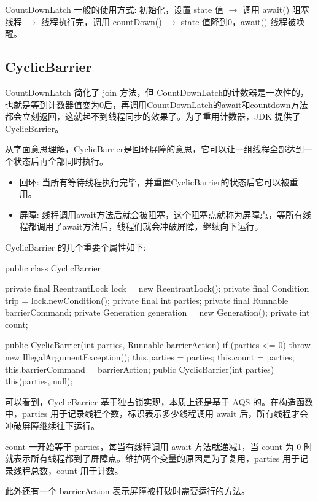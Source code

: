 CountDownLatch 一般的使用方式: 初始化，设置 state 值 $\rightarrow$ 调用 await() 阻塞线程 $\rightarrow$ 线程执行完，调用 countDown()  $\rightarrow$ state 值降到0，await() 线程被唤醒。

\subsection{CyclicBarrier}

CountDownLatch 简化了 join 方法，但 CountDownLatch的计数器是一次性的，也就是等到计数器值变为0后，再调用CountDownLatch的await和countdown方法都会立刻返回，这就起不到线程同步的效果了。为了重用计数器，JDK 提供了 CyclicBarrier。

从字面意思理解，CyclicBarrier是回环屏障的意思，它可以让一组线程全部达到一个状态后再全部同时执行。
\begin{itemize}
    \item 回环: 当所有等待线程执行完毕，并重置CyclicBarrier的状态后它可以被重用。
    \item 屏障: 线程调用await方法后就会被阻塞，这个阻塞点就称为屏障点，等所有线程都调用了await方法后，线程们就会冲破屏障，继续向下运行。
\end{itemize}

CyclicBarrier 的几个重要个属性如下:

\begin{Java}
public class CyclicBarrier {
    private final ReentrantLock lock = new ReentrantLock();
    private final Condition trip = lock.newCondition();
    private final int parties;
    private final Runnable barrierCommand;
    private Generation generation = new Generation();
    private int count;

    public CyclicBarrier(int parties, Runnable barrierAction) {
        if (parties <= 0) throw new IllegalArgumentException();
        this.parties = parties;
        this.count = parties;
        this.barrierCommand = barrierAction;
    }
    public CyclicBarrier(int parties) {
        this(parties, null);
    }
}
\end{Java}

可以看到，CyclicBarrier 基于独占锁实现，本质上还是基于 AQS 的。在构造函数中，parties 用于记录线程个数，标识表示多少线程调用 await 后，所有线程才会冲破屏障继续往下运行。

count 一开始等于 parties，每当有线程调用 await 方法就递减1，当 count 为 0 时就表示所有线程都到了屏障点。维护两个变量的原因是为了复用，parties 用于记录线程总数，count 用于计数。

此外还有一个 barrierAction 表示屏障被打破时需要运行的方法。

